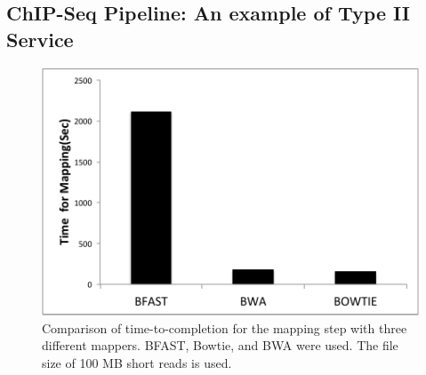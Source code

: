 \documentclass{cpeauth}
\begin{document}
\subsection{ChIP-Seq Pipeline: An example of Type II Service}

\begin{figure}
 \centering
\includegraphics[scale=0.46]{figures/chip-seq-mapper-dependency-ttc.pdf}
\caption{\small Comparison of time-to-completion for the mapping step with three different mappers.  BFAST, Bowtie, and BWA were used. The file size of 100 MB short reads is used.  
}
  \label{fig:chip-seq-comp} 
 \end{figure}
 
\end{document}

